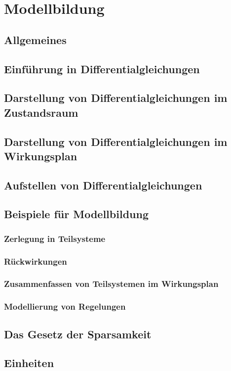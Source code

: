 \documentclass[12pt]{article}
\begin{document}
\clearpage
\section{Modellbildung}
\subsection{Allgemeines}
\subsection{Einführung in Differentialgleichungen}
\subsection{Darstellung von Differentialgleichungen im Zustandsraum}
\subsection{Darstellung von Differentialgleichungen im Wirkungsplan}
\subsection{Aufstellen von Differentialgleichungen}
\subsection{Beispiele für Modellbildung}
\subsubsection{Zerlegung in Teilsysteme}
\subsubsection{Rückwirkungen}
\subsubsection{Zusammenfassen von Teilsystemen im Wirkungsplan}
\subsubsection{Modellierung von Regelungen}
\subsection{Das Gesetz der Sparsamkeit}
\subsection{Einheiten}
\clearpage
\end{document}
